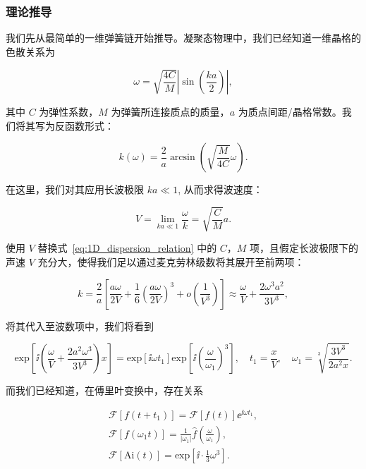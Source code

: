 \subsubsection{理论推导}

我们先从最简单的一维弹簧链开始推导。凝聚态物理中，我们已经知道一维晶格的色散关系为

\begin{equation}
  \omega=\sqrt{\frac{4C}{M}}\left|\sin\left(\frac{ka}{2}\right)\right|,
\end{equation}

其中 $C$ 为弹性系数，$M$ 为弹簧所连接质点的质量，$a$ 为质点间距/晶格常数。我们将其写为反函数形式：

\begin{equation}
  k(\omega) = \frac{2}{a}\arcsin{\left(\sqrt{\frac{M}{4C}}\omega\right)}.\label{eq:1D_dispersion_relation}
\end{equation}

在这里，我们对其应用长波极限 $ka\ll 1$, 从而求得波速度：

\begin{equation}
  V = \lim_{ka\ll 1}\frac{\omega}{k} = \sqrt{\frac{C}{M}}a.
\end{equation}

使用 $V$ 替换式~\eqref{eq:1D_dispersion_relation} 中的 $C$，$M$ 项，且假定长波极限下的声速 $V$ 充分大，使得我们足以通过麦克劳林级数将其展开至前两项：

\begin{equation}
  k = \frac{2}{a}\left[\frac{a\omega}{2V} + \frac{1}{6}\left(\frac{a\omega}{2V}\right)^{3} + o\left(\frac{1}{V^3}\right)\right]\approx\frac{\omega}{V} + \frac{2\omega^{3}a^{2}}{3V^{3}},
\end{equation}

将其代入至波数项中，我们将看到

\begin{equation}
  \text{exp}\left[{\ii \left(\frac{\omega}{V} + \frac{2a^{2}\omega^{3}}{3V^{3}}\right)x}\right] = \text{exp}[{\ii\omega t_{1}}]\text{exp}\left[{\ii\left(\frac{\omega}{\omega_{1}}\right)^{3}}\right],\quad t_{1} = \frac{x}{V},\quad \omega_{1} = \sqrt[3]{\frac{3V^{3}}{2a^{2}x}}.\label{eq:rescale_method}
\end{equation}

而我们已经知道，在傅里叶变换中，存在关系

\begin{align}
  \mathcal{F}[f(t+t_{1})] = \mathcal{F}[f(t)]{\ee}^{\ii\omega t_{1}},\label{eq:translation_property}\\
  \mathcal{F}[f(\omega_{1}t)] = \frac{1}{|\omega_{1}|}\hat{f}\left(\frac{\omega}{\omega_{1}}\right),\label{eq:scale_property}\\
  \mathcal{F}[\text{Ai}(t)] = \text{exp}\left[\ii\cdot \frac{1}{3}\omega^3\right].
\end{align}

